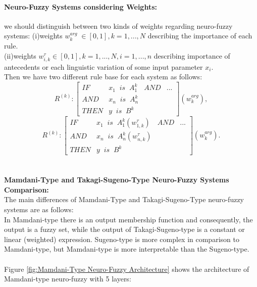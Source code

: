 \paragraph{Neuro-Fuzzy Systems considering Weights:}
we should distinguish between two kinds of weights regarding neuro-fuzzy systems:
(i)weights $w_{k}^{arg}\; \in \left[0,1\right], k=1,...,N$ describing the importance of each rule.\\
(ii)weights $w_{i,k}^{\tau}\in\left[0,1\right], k=1,...,N,i=1,...,n$ describing importance of antecedents or each linguistic variation of some input parameter $x_{i}$.  \\
Then we have two different rule base for each system as follows:
\begin{equation}
    R^{\left ( k \right )}:\begin{bmatrix}
IF & x_{1}\;\;is\;\;A_{1}^{k} & AND & ... \\ 
 AND& x_{n}\;\;is\;\;A_{n}^{k} &  & \\ 
 THEN& y\;\;is\;\;B^{k} &  & 
\end{bmatrix}\left ( w_{k}^{arg} \right ),
\end{equation}
\begin{equation}
    R^{\left ( k \right )}:\begin{bmatrix}
IF & x_{1}\;\;is\;\;A_{1}^{k}\left ( w_{1,k}^{\tau} \right ) & AND & ... \\ 
 AND& x_{n}\;\;is\;\;A_{n}^{k}\left ( w_{n,k}^{\tau} \right ) &  & \\ 
 THEN& y\;\;is\;\;B^{k} &  & 
\end{bmatrix}\left ( w_{k}^{arg} \right ).
\end{equation}\\\\
\textbf{Mamdani-Type and Takagi-Sugeno-Type Neuro-Fuzzy Systems Comparison:}\\
The main differences of Mamdani-Type and Takagi-Sugeno-Type neuro-fuzzy systems are as follows\cite{DBLP:journals/ijautcomp/EgajiGHY15}:\\
In Mamdani-type there is an output membership function and consequently, the output is a fuzzy set, while the output of Takagi-Sugeno-type is a constant or linear (weighted) expression. Sugeno-type is more complex in comparison to Mamdani-type, but Mamdani-type is more interpretable than the Sugeno-type.\\\\
Figure \ref{fig:Mamdani-Type Neuro-Fuzzy Architecture} shows the architecture of Mamdani-type neuro-fuzzy with 5 layers:\\\\
